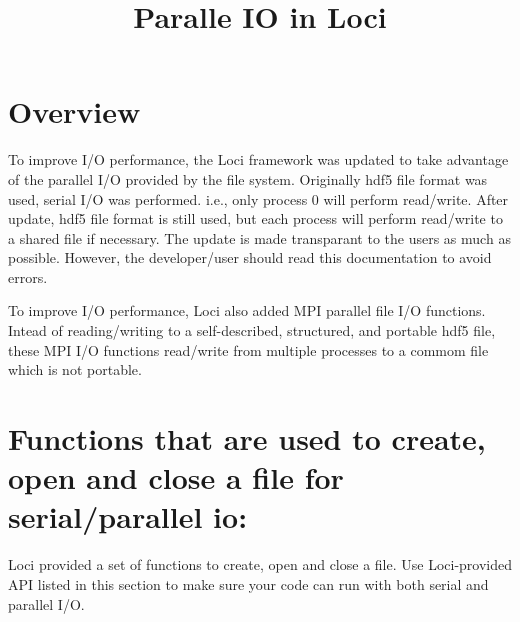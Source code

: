 \documentclass{article}
\begin{document}
\title{
{\bf Paralle IO in Loci}
}
\maketitle
\section{Overview}
To improve I/O performance, the Loci framework was updated to take
advantage of the parallel I/O provided by the file system.
Originally hdf5 file format was used, serial I/O was performed. i.e.,
only process 0 will perform read/write.   After update, hdf5 file
format is still used, but each process will perform read/write to a
shared file if necessary. The update is made transparant to the users
as much as possible. However, the developer/user should read this
documentation to avoid errors.

To improve I/O performance, Loci also added MPI parallel file  I/O functions. Intead of
reading/writing to a self-described, structured, and portable hdf5
file, these MPI I/O
functions read/write  from multiple processes to a commom file which
is not portable.     

   
\section{Functions that are used to create, open and close a file for
serial/parallel io:}

Loci provided a set of functions to  create, open and close a file. Use
Loci-provided API listed in this section to make sure your code can
run with both serial and parallel I/O.
\end{document}
